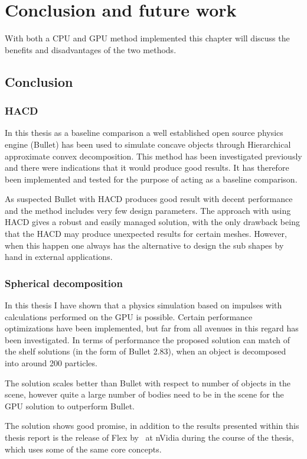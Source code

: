 \chapter{Conclusion and future work}
With both a CPU and GPU method implemented this chapter will discuss the benefits
and disadvantages of the two methods.
\section{Conclusion}
\subsection{HACD}
In this thesis as a baseline comparison a well established open source physics engine
(Bullet) has been used to simulate concave objects through Hierarchical approximate
 convex decomposition. This method has been investigated previously and there were
 indications that it would produce good results. It has therefore been implemented
 and tested for the purpose of acting as a baseline comparison.

As suspected Bullet with HACD produces good result with decent performance and
the method includes very few design parameters. The approach with using HACD gives
a robust and easily managed solution, with the only drawback being that the HACD
may produce unexpected results for certain meshes. However, when this happen
one always has the alternative to design the sub shapes by hand in external applications.

\subsection{Spherical decomposition}
In this thesis I have shown that a physics simulation based on impulses with
calculations performed on the GPU is possible. Certain performance optimizations
have been implemented, but far from all avenues in this regard has been investigated.
 In terms of performance the proposed solution can match of the shelf
solutions (in the form of Bullet 2.83), when an object is decomposed into around
200 particles.

The solution scales better than Bullet with respect to number of objects in the scene,
however quite a large number of bodies need to be in the scene for the GPU solution to
outperform Bullet.

The solution shows good promise, in addition to the results presented within this
thesis report is the release of Flex by~\cite{flex} at nVidia
during the course of the thesis, which uses some of the same core concepts.

